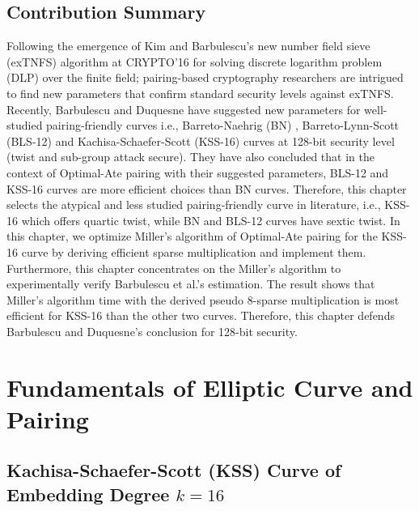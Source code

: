 \subsection{Contribution Summary}
Following the emergence of Kim and Barbulescu's new number field sieve (exTNFS) algorithm at CRYPTO'16 \cite{C:KimBar16} for solving discrete logarithm problem (DLP) over the finite field; pairing-based cryptography researchers are intrigued to find new parameters that confirm standard security levels against exTNFS. 
Recently, Barbulescu and Duquesne have suggested new parameters \cite{EPRINT:BarDuq17} for well-studied pairing-friendly curves i.e., Barreto-Naehrig (BN) \cite{SAC:BarNae05}, Barreto-Lynn-Scott (BLS-12) \cite{SCN:BarLynSco02} and Kachisa-Schaefer-Scott (KSS-16) \cite{EPRINT:KacSchSco07} curves at 128-bit security level (twist and sub-group attack secure). 
They have also concluded that in the context of Optimal-Ate pairing with their suggested parameters, BLS-12 and KSS-16 curves are more efficient choices than BN curves. 
Therefore, this chapter selects the atypical and less studied pairing-friendly curve in literature, i.e., KSS-16 which offers quartic twist, while BN and BLS-12 curves have sextic twist.
In this chapter, we optimize Miller's algorithm of Optimal-Ate pairing for the KSS-16 curve by deriving efficient sparse multiplication and implement them.
Furthermore, this chapter concentrates on the Miller's algorithm to experimentally verify Barbulescu et al.'s estimation.
The result shows that Miller's algorithm time with the derived pseudo 8-sparse multiplication is most efficient for KSS-16 than the other two curves.
Therefore, this chapter defends Barbulescu and Duquesne's conclusion for 128-bit security.


\section{Fundamentals of Elliptic Curve and Pairing}

\subsection{Kachisa-Schaefer-Scott (KSS) Curve of Embedding Degree \texorpdfstring{$k=16$}{k=16}}
\label{sec:ch:indo:kss16curve}

